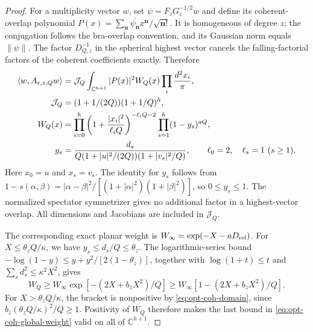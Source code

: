 \begin{proof}
For a multiplicity vector $w$, set $\psi=F_zG_z^{-1/2}w$ and define its
coherent-overlap polynomial
$P(x)=\sum_{\boldsymbol n}\overline{\psi_{\boldsymbol n}}
x^{\boldsymbol n}/\sqrt{\boldsymbol n!}$.
It is homogeneous of degree $z$; the conjugation follows the bra-overlap
convention, and its Gaussian norm equals $\|\psi\|$.
The factor $D_{Q,z}^{-1}$ in the spherical highest vector cancels the
falling-factorial factors of the coherent coefficients exactly. Therefore
\begin{align}
 \langle w,A_{r,z,Q}w\rangle
 &=\mathcal J_Q\int_{\mathbb C^{h+1}}|P(x)|^2W_Q(x)
                      \prod_i\frac{d^2x_i}{\pi},\\
 \mathcal J_Q&=(1+1/(2Q))(1+1/Q)^h,\notag\\
 W_Q(x)&=\prod_{i=0}^h
 \left(1+\frac{|x_i|^2}{\ell_iQ}\right)^{-\ell_iQ-2}
                  \prod_{s=1}^h(1-y_s)^{aQ},\notag\\
 y_s&=\frac{d_s}{Q(1+|u|^2/(2Q))(1+|v_s|^2/Q)},
 \qquad \ell_0=2,\quad\ell_s=1\ (s\ge1).\notag
\end{align}
Here $x_0=u$ and $x_s=v_s$. The identity for $y_s$ follows from
$1-s(\alpha,\beta)=|\alpha-\beta|^2/
[(1+|\alpha|^2)(1+|\beta|^2)]$, so $0\le y_s\le1$.
The normalized spectator symmetrizer gives no additional factor in a
highest-vector overlap. All dimensions and Jacobians are included in
$\mathcal J_Q$.

The corresponding exact planar weight is
$W_\infty=\exp(-X-aD_{\rm rel})$. For $X\le\theta_zQ/\kappa$,
we have $y_s\le d_s/Q\le\theta_z$. The logarithmic-series bound
$-\log(1-y)\le y+y^2/[2(1-\theta_z)]$, together with
$\log(1+t)\le t$ and $\sum_sd_s^2\le\kappa^2X^2$, gives
\begin{equation}\label{eq:opt-coh-global-weight}
 W_Q\ge W_\infty\exp[-(2X+b_zX^2)/Q]
      \ge W_\infty[1-(2X+b_zX^2)/Q].
\end{equation}
For $X>\theta_zQ/\kappa$, the bracket is nonpositive by
\eqref{eq:opt-coh-domain}, since
$b_z(\theta_zQ/\kappa)^2/Q\ge1$.
Positivity of $W_Q$ therefore makes the last bound in
\eqref{eq:opt-coh-global-weight} valid on all of $\mathbb C^{h+1}$.


\end{proof}
